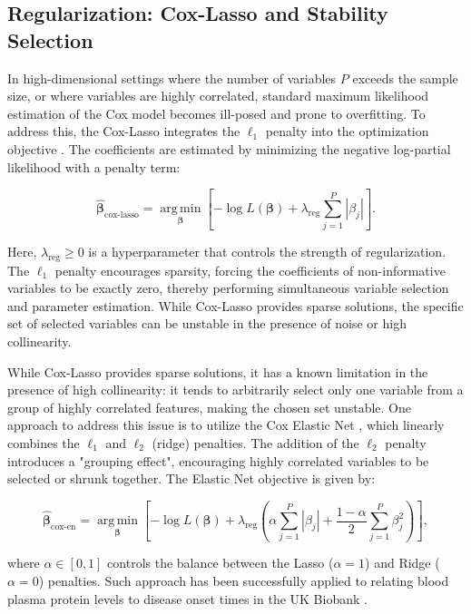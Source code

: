 \subsection{Regularization: Cox-Lasso and Stability Selection}
In high-dimensional settings where the number of variables $P$ exceeds the sample size, or where variables are highly correlated, standard maximum likelihood estimation of the Cox model becomes ill-posed and prone to overfitting. To address this, the Cox-Lasso integrates the $\ell_1$ penalty into the optimization objective \cite{tibshirani_lasso_1997,Simon2011}. The coefficients are estimated by minimizing the negative log-partial likelihood with a penalty term:

\begin{equation}
    \hat{\bm{\beta}}_{\text{cox-lasso}} = \operatorname*{arg\,min}_{\bm{\beta}} \left[ - \log L(\bm{\beta}) + \lambda_{\text{reg}} \sum_{j=1}^P |\beta_j| \right].
\end{equation}

Here, $\lambda_{\text{reg}} \ge 0$ is a hyperparameter that controls the strength of regularization. The $\ell_1$ penalty encourages sparsity, forcing the coefficients of non-informative variables to be exactly zero, thereby performing simultaneous variable selection and parameter estimation. While Cox-Lasso provides sparse solutions, the specific set of selected variables can be unstable in the presence of noise or high collinearity. 

While Cox-Lasso provides sparse solutions, it has a known limitation in the presence of high collinearity: it tends to arbitrarily select only one variable from a group of highly correlated features, making the chosen set unstable. One approach to address this issue is to utilize the Cox Elastic Net \cite{Simon2011}, which linearly combines the $\ell_1$ and $\ell_2$ (ridge) penalties. The addition of the $\ell_2$ penalty introduces a "grouping effect", encouraging highly correlated variables to be selected or shrunk together. The Elastic Net objective is given by:

\begin{equation}
    \hat{\bm{\beta}}_{\text{cox-en}} = \operatorname*{arg\,min}_{\bm{\beta}} \left[ - \log L(\bm{\beta}) + \lambda_{\text{reg}} \left( \alpha \sum_{j=1}^P |\beta_j| + \frac{1-\alpha}{2} \sum_{j=1}^P \beta_j^2 \right) \right],
\end{equation}

where $\alpha \in [0, 1]$ controls the balance between the Lasso ($\alpha=1$) and Ridge ($\alpha=0$) penalties. Such approach has been successfully applied to relating blood plasma protein levels to disease onset times in the UK Biobank \cite{Smith2025}.

